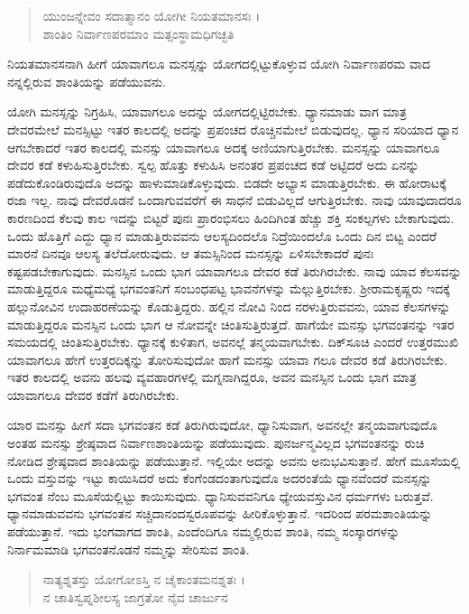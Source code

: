 \begin{verse}
ಯುಂಜನ್ನೇವಂ ಸದಾತ್ಮಾನಂ ಯೋಗೀ ನಿಯತಮಾನಸಃ ।\\ಶಾಂತಿಂ ನಿರ್ವಾಣಪರಮಾಂ ಮತ್ಸಂಸ್ಥಾಮಧಿಗಚ್ಛತಿ 
\end{verse}

{\small ನಿಯತಮಾನಸನಾಗಿ ಹೀಗೆ ಯಾವಾಗಲೂ ಮನಸ್ಸನ್ನು ಯೋಗದಲ್ಲಿಟ್ಟುಕೊಳ್ಳುವ ಯೋಗಿ ನಿರ್ವಾಣಪರಮ ವಾದ ನನ್ನಲ್ಲಿರುವ ಶಾಂತಿಯನ್ನು ಪಡೆಯುವನು.}

ಯೋಗಿ ಮನಸ್ಸನ್ನು ನಿಗ್ರಹಿಸಿ, ಯಾವಾಗಲೂ ಅದನ್ನು ಯೋಗದಲ್ಲಿಟ್ಟಿರಬೇಕು. ಧ್ಯಾನಮಾಡು ವಾಗ ಮಾತ್ರ ದೇವರಮೇಲೆ ಮನಸ್ಸಿಟ್ಟು ಇತರ ಕಾಲದಲ್ಲಿ ಅದನ್ನು ಪ್ರಪಂಚದ ರೊಚ್ಚಿನಮೇಲೆ ಬಿಡುವುದಲ್ಲ. ಧ್ಯಾನ ಸರಿಯಾದ ಧ್ಯಾನ ಆಗಬೇಕಾದರೆ ಇತರ ಕಾಲದಲ್ಲಿ ಮನಸ್ಸು ಯಾವಾಗಲೂ ಅದಕ್ಕೆ ಅಣಿಯಾಗುತ್ತಿರಬೇಕು. ಮನಸ್ಸನ್ನು ಯಾವಾಗಲೂ ದೇವರ ಕಡೆ ಕಳುಹಿಸುತ್ತಿರಬೇಕು. ಸ್ವಲ್ಪ ಹೊತ್ತು ಕಳುಹಿಸಿ ಅನಂತರ ಪ್ರಪಂಚದ ಕಡೆ ಅಟ್ಟಿದರೆ ಅದು ಏನನ್ನು ಪಡೆದುಕೊಂಡಿರುವುದೊ ಅದನ್ನು ಹಾಳುಮಾಡಿಕೊಳ್ಳುವುದು. ಬಿಡದೇ ಅಭ್ಯಾಸ ಮಾಡುತ್ತಿರಬೇಕು. ಈ ಹೋರಾಟಕ್ಕೆ ರಜಾ ಇಲ್ಲ. ನಾವು ದೇವರೊಡನೆ ಒಂದಾಗುವವರೆಗೆ ಈ ಸಾಧನೆ ಬಿಡುವಿಲ್ಲದೆ ಆಗುತ್ತಿರಬೇಕು. ನಾವು ಯಾವುದಾದರೂ ಕಾರಣದಿಂದ ಕೆಲವು ಕಾಲ ಇದನ್ನು ಬಿಟ್ಟರೆ ಪುನಃ ಪ್ರಾರಂಭಿಸಲು ಹಿಂದಿಗಿಂತ ಹೆಚ್ಚು ಶಕ್ತಿ ಸಂಕಲ್ಪಗಳು ಬೇಕಾಗುವುದು. ಒಂದು ಹೊತ್ತಿಗೆ ಎದ್ದು ಧ್ಯಾನ ಮಾಡುತ್ತಿರುವವನು ಆಲಸ್ಯದಿಂದಲೊ ನಿದ್ರೆಯಿಂದಲೊ ಒಂದು ದಿನ ಬಿಟ್ಟ ಎಂದರೆ ಮಾರನೆ ದಿನವೂ ಆಲಸ್ಯ ತಲೆದೋರುವುದು. ಆ ತಮಸ್ಸಿನಿಂದ ಮನಸ್ಸನ್ನು ಏಳಿಸಬೇಕಾದರೆ ಪುನಃ ಕಷ್ಟಪಡಬೇಕಾಗುವುದು. ಮನಸ್ಸಿನ ಒಂದು ಭಾಗ ಯಾವಾಗಲೂ ದೇವರ ಕಡೆ ತಿರುಗಿರಬೇಕು. ನಾವು ಯಾವ ಕೆಲಸವನ್ನು ಮಾಡುತ್ತಿದ್ದರೂ ಮಧ್ಯೆಮಧ್ಯೆ ಭಗವಂತನಿಗೆ ಸಂಬಂಧಪಟ್ಟ ಭಾವನೆಗಳನ್ನು ಮೆಲ್ಲುತ್ತಿರಬೇಕು. ಶ್ರೀರಾಮಕೃಷ್ಣರು ಇದಕ್ಕೆ ಹಲ್ಲುನೋವಿನ ಉದಾಹರಣೆಯನ್ನು ಕೊಡುತ್ತಿದ್ದರು. ಹಲ್ಲಿನ ನೋವಿ ನಿಂದ ನರಳುತ್ತಿರುವವನು, ಯಾವ ಕೆಲಸಗಳನ್ನು ಮಾಡುತ್ತಿದ್ದರೂ ಮನಸ್ಸಿನ ಒಂದು ಭಾಗ ಆ ನೋವನ್ನೇ ಚಿಂತಿಸುತ್ತಿರುತ್ತದೆ. ಹಾಗೆಯೇ ಮನಸ್ಸು ಭಗವಂತನನ್ನು ಇತರ ಸಮಯದಲ್ಲಿ ಚಿಂತಿಸುತ್ತಿರಬೇಕು. ಧ್ಯಾನಕ್ಕೆ ಕುಳಿತಾಗ, ಅವನಲ್ಲೆ ತನ್ಮಯವಾಗಬೇಕು. ದಿಕ್​ಸೂಚಿ ಎಂದರೆ ಉತ್ತರಮುಖಿ ಯಾವಾಗಲೂ ಹೇಗೆ ಉತ್ತರದಿಕ್ಕನ್ನು ತೋರಿಸುವುದೋ ಹಾಗೆ ಮನಸ್ಸು ಯಾವಾ ಗಲೂ ದೇವರ ಕಡೆ ತಿರುಗಿರಬೇಕು. ಇತರ ಕಾಲದಲ್ಲಿ ಅವನು ಹಲವು ವ್ಯವಹಾರಗಳಲ್ಲಿ ಮಗ್ನನಾಗಿದ್ದರೂ, ಅವನ ಮನಸ್ಸಿನ ಒಂದು ಭಾಗ ಮಾತ್ರ ಯಾವಾಗಲೂ ದೇವರ ಕಡೆಗೆ ತಿರುಗಿರಬೇಕು.

ಯಾರ ಮನಸ್ಸು ಹೀಗೆ ಸದಾ ಭಗವಂತನ ಕಡೆ ತಿರುಗಿರುವುದೋ, ಧ್ಯಾನಿಸುವಾಗ, ಅವನಲ್ಲೇ ತನ್ಮಯವಾಗುವುದೊ ಅಂತಹ ಮನಸ್ಸು ಶ್ರೇಷ್ಠವಾದ ನಿರ್ವಾಣಶಾಂತಿಯನ್ನು ಪಡೆಯುವುದು. ಪುನರ್ಜನ್ಮವಿಲ್ಲದ ಭಗವಂತನನ್ನು ರುಚಿ ನೋಡಿದ ಶ್ರೇಷ್ಠವಾದ ಶಾಂತಿಯನ್ನು ಪಡೆಯುತ್ತಾನೆ. ಇಲ್ಲಿಯೇ ಅದನ್ನು ಅವನು ಅನುಭವಿಸುತ್ತಾನೆ. ಹೇಗೆ ಮೂಸೆಯಲ್ಲಿ ಒಂದು ವಸ್ತುವನ್ನು ಇಟ್ಟು ಕಾಯಿಸಿದರೆ ಅದು ಕೆಂಗೆಂಡದಂತಾಗುವುದೊ ಅದರಂತೆಯೆ ಧ್ಯಾನವೆಂದರೆ ಮನಸ್ಸನ್ನು ಭಗವಂತ ನೆಂಬ ಮೂಸೆಯಲ್ಲಿಟ್ಟು ಕಾಯಿಸುವುದು. ಧ್ಯಾನಿಸುವವನಿಗೂ ಧ್ಯೇಯವಸ್ತುವಿನ ಧರ್ಮಗಳು ಬರುತ್ತವೆ. ಧ್ಯಾನಮಾಡುವವನು ಭಗವಂತನ ಸಚ್ಚಿದಾನಂದಸ್ವರೂಪವನ್ನು ಹೀರಿಕೊಳ್ಳುತ್ತಾನೆ. ಇದರಿಂದ ಪರಮಶಾಂತಿಯನ್ನು ಪಡೆಯುತ್ತಾನೆ. ಇದು ಭಂಗವಾಗದ ಶಾಂತಿ, ಎಂದೆಂದಿಗೂ ನಮ್ಮಲ್ಲಿರುವ ಶಾಂತಿ, ನಮ್ಮ ಸಂಸ್ಕಾರಗಳನ್ನು ನಿರ್ನಾಮಮಾಡಿ ಭಗವಂತನೊಡನೆ ನಮ್ಮನ್ನು ಸೇರಿಸುವ ಶಾಂತಿ.

\begin{verse}
ನಾತ್ಯಶ್ನತಸ್ತು ಯೋಗೋಽಸ್ತಿ ನ ಚೈಕಾಂತಮನಶ್ನತಃ ।\\ನ ಚಾತಿಸ್ವಪ್ನಶೀಲಸ್ಯ ಜಾಗ್ರತೋ ನೈವ ಚಾರ್ಜುನ 
\end{verse}

